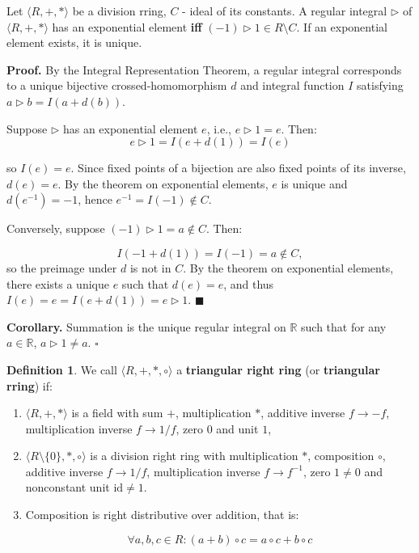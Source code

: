 \documentclass[12pt]{article}
\theoremstyle{definition}
\newtheorem{definition}{Definition}[section]
\begin{document}
Let $\langle R, +, * \rangle$ be a division rring, $C$ - ideal of its constants. A regular integral $\triangleright$ of $\langle R, +, * \rangle$ has an exponential element \textbf{iff} $(-1) \triangleright 1 \in R \setminus C$. If an exponential element exists, it is unique.

\vspace{10pt}
\noindent\textbf{Proof.} 
By the Integral Representation Theorem, a regular integral corresponds to a unique bijective crossed-homomorphism $d$ and integral function $I$ satisfying $a \triangleright b = I(a + d(b))$.

\vspace{5pt}
Suppose $\triangleright$ has an exponential element $e$, i.e., $e \triangleright 1 = e$. Then:
\[
e \triangleright 1 = I(e + d(1)) = I(e)
\]

so $I(e) = e$. Since fixed points of a bijection are also fixed points of its inverse, $d(e) = e$. By the theorem on exponential elements, $e$ is unique and $d(e^{-1}) = -1$, hence $e^{-1} = I(-1) \notin C$.

\vspace{5pt}
Conversely, suppose $(-1) \triangleright 1 = a \notin C$. Then:

\[
I(-1 + d(1)) = I(-1) = a \notin C,
\]
so the preimage under $d$ is not in $C$. By the theorem on exponential elements, there exists a unique $e$ such that $d(e) = e$, and thus $I(e) = e = I(e + d(1)) = e \triangleright 1$. $\blacksquare$

\vspace{10pt}
\textbf{Corollary.} Summation is the unique regular integral on $\mathbb{R}$ such that for any $a \in \mathbb{R}$, $a \triangleright 1 \neq a$. $\square$


\begin{definition} We call $\langle R, +, *, \circ \rangle$ a \textbf{triangular right ring} (or \textbf{triangular rring}) if:
\begin{enumerate}
\item $\langle R, +, * \rangle$ is a field with sum $+$, multiplication $*$, additive inverse $f \to -f$, multiplication inverse $f \to 1/f$, zero $0$ and unit $1$,
\item $\langle R \setminus \{0\}, *, \circ \rangle$ is a division right ring with multiplication $*$, composition $\circ$, additive inverse $f \to 1/f$, multiplication inverse $f \to f^{-1}$, zero $1 \neq 0$ and nonconstant unit $\mathrm{id} \neq 1$.  
\item Composition is right distributive over addition, that is:  

\[
\forall a, b, c \in R: (a + b) \circ c = a \circ c + b \circ c  
\]

\end{enumerate}
\end{definition}
\end{document}
